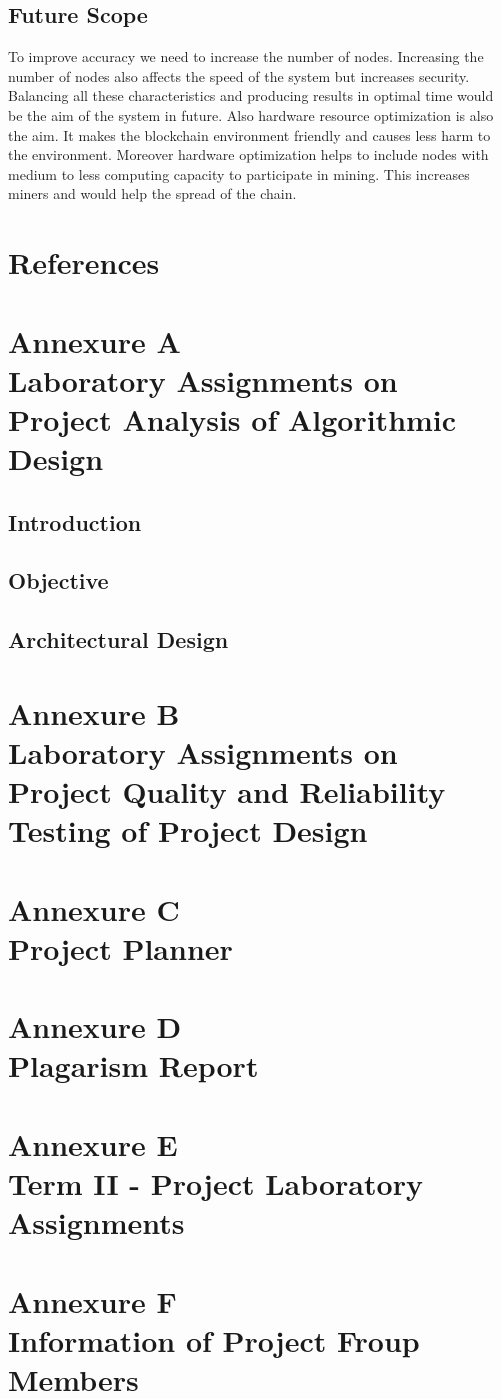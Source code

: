 \documentclass[oneside, 12pt]{book}
\begin{document}
		\subsection{Future Scope}
			To improve accuracy we need to increase the number of nodes. Increasing the number of nodes also affects the speed of the system but increases security. Balancing all these characteristics and producing results in optimal time would be the aim of the system in future. Also hardware resource optimization is also the aim. It makes the blockchain environment friendly and causes less harm to the environment. Moreover hardware optimization helps to include nodes with medium to less computing capacity to participate in mining. This increases miners and  would help the spread of the chain.
	\newpage
	\section{References}
	\newpage
		
		
	\newpage
	\section{Annexure A\\Laboratory Assignments on Project Analysis of Algorithmic Design}
	\newpage
		\subsection{Introduction}
		\subsection{Objective}
		\subsection{Architectural Design}
	\newpage
	\section{Annexure B\\Laboratory Assignments on Project Quality and Reliability Testing of Project Design}
	\newpage
	\section{Annexure C\\Project Planner}
	\newpage
	\section{Annexure D\\Plagarism Report}
	\newpage
	\section{Annexure E\\Term II - Project Laboratory Assignments}
	\newpage
	\section{Annexure F\\Information of Project Froup Members}
	\newpage
\end{document}
